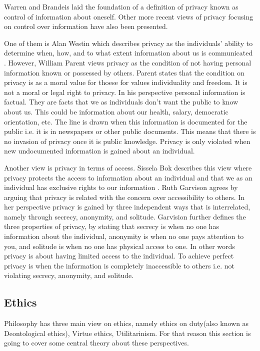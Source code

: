 Warren and Brandeis laid the foundation of a definition of privacy known as control of information about oneself. Other more recent views of privacy focusing on control over information have also been presented.

One of them is Alan Westin which describes privacy as the individuals' ability to determine when, how, and to what extent information about us is communicated \cite{westin:1969}. 
However, William Parent views privacy as the condition of not having personal information known or possessed by others. Parent states that the condition on privacy is as a moral value for thoese for values individuality and freedom. It is not a moral or legal right to privacy. In his perspective personal information is factual. They are facts that we as individuals don't want the public to know about us. This could be information about our health, salary, democratic orientation, etc. The line is drawn when this information is documented for the public i.e. it is in newspapers or other public documents. This means that there is no invasion of privacy once it is public knowledge. Privacy is only violated when new undocumented information is gained about an individual.  

Another view is privacy in terms of access. Sissela Bok describes this view where privacy protects the access to information about an individual and that we as an individual has exclusive rights to our information  \cite{bok:1982}. Ruth Garvison agrees by arguing that privacy is related with the concern over accessibility to others. In her perspective privacy is gained by three independent ways that is interrelated, namely through secrecy, anonymity, and solitude. Garvision further defines the three properties of privacy, by stating that secrecy is when no one has information about the individual, anonymity is when no one pays attention to you, and solitude is when no one has physical access to one.  
In other words privacy is about having limited access to the individual. To achieve perfect privacy is when the information is completely inaccessible to others i.e. not violating secrecy, anonymity, and solitude. 

\subsection{Ethics}
Philosophy has three main view on ethics, namely ethics on duty(also known as Deontological ethics), Virtue ethics, Utilitarinism. For that reason this section is going to cover some central theory about these perspectives.

